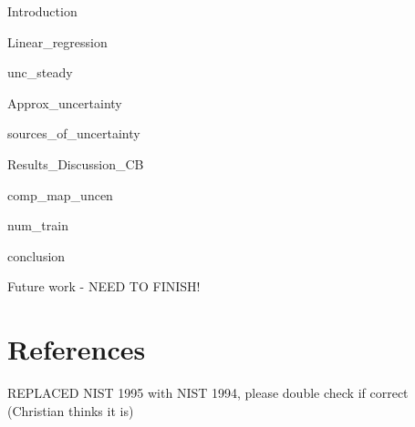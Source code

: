 \documentclass[a4paper]{jpconf}
\newcommand{\blCom}[1]{\begingroup\sffamily\color{blue} #1 \endgroup}  %
\begin{document}
\blCom{Introduction} %


\blCom{Linear\_regression}


\blCom{unc\_steady}


\blCom{Approx\_uncertainty}


\blCom{sources\_of\_uncertainty}


\blCom{Results\_Discussion\_CB}



\blCom{comp\_map\_uncen}


\blCom{num\_train}



\blCom{conclusion}


\blCom{Future work - NEED TO FINISH!}


\section*{References}
\blCom{REPLACED NIST 1995 with NIST 1994, please double check if correct (Christian thinks it is)}


%
\end{document}
